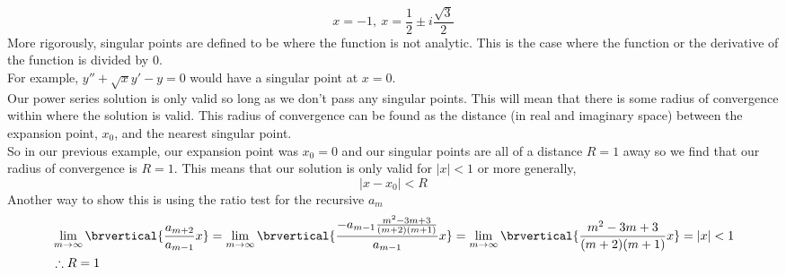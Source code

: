 $$x=-1,\ x=\frac{1}{2}\pm i\frac{\sqrt{3}}{2}$$
More rigorously, singular points are defined to be where the function is not analytic. This is the case where the function or the derivative of the function is divided by 0.\\
For example, $y''+\sqrt{x}y'-y=0$ would have a singular point at $x=0$.\\
Our power series solution is only valid so long as we don't pass any singular points. This will mean that there is some radius of convergence within where the solution is valid. This radius of convergence can be found as the distance (in real and imaginary space) between the expansion point, $x_0$, and the nearest singular point.\\
So in our previous example, our expansion point was $x_0=0$ and our singular points are all of a distance $R=1$ away so we find that our radius of convergence is $R=1$. This means that our solution is only valid for $|x|<1$ or more generally,
$$|x-x_0|<R$$
Another way to show this is using the ratio test for the recursive $a_m$
\begin{align*}
    &\lim_{m\to\infty}\brvertical{\frac{a_{m+2}}{a_{m-1}}x}=\lim_{m\to\infty}\brvertical{\frac{-a_{m-1}\frac{m^2-3m+3}{(m+2)(m+1)}}{a_{m-1}}x}=\lim_{m\to\infty}\brvertical{\frac{m^2-3m+3}{(m+2)(m+1)}x}=|x|<1\\
    &\therefore R=1
\end{align*}
